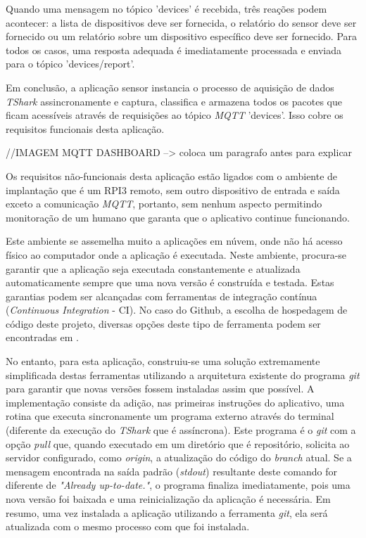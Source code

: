 Quando uma mensagem no tópico 'devices' é recebida, três reações podem acontecer:
a lista de dispositivos deve ser fornecida, o relatório do sensor deve ser
fornecido ou um relatório sobre um dispositivo específico deve ser fornecido.
Para todos os casos, uma resposta adequada é imediatamente processada e enviada
para o tópico 'devices/report'.

Em conclusão, a aplicação sensor instancia o processo de aquisição de dados
\emph{TShark} assincronamente e captura, classifica e armazena todos os pacotes
que ficam acessíveis através de requisições ao tópico \emph{MQTT} 'devices'.
Isso cobre os requisitos funcionais desta aplicação.

//IMAGEM MQTT DASHBOARD --> coloca um paragrafo antes para explicar

Os requisitos não-funcionais desta aplicação estão ligados com o ambiente de
implantação que é um RPI3 remoto, sem outro dispositivo de entrada e saída
exceto a comunicação \emph{MQTT}, portanto, sem nenhum aspecto permitindo
monitoração de um humano que garanta que o aplicativo continue funcionando.

Este ambiente se assemelha muito a aplicações em núvem, onde não há acesso
físico ao computador onde a aplicação é executada. Neste ambiente, procura-se
garantir que a aplicação seja executada constantemente e atualizada
automaticamente sempre que uma nova versão é construída e testada. Estas
garantias podem ser alcançadas com ferramentas de integração contínua
(\emph{Continuous Integration} - CI). No caso do Github, a escolha de hospedagem
de código deste projeto, diversas opções deste tipo de ferramenta podem ser
encontradas em \cite{githubdeploy}.

No entanto, para esta aplicação, construiu-se uma solução extremamente
simplificada destas ferramentas utilizando a arquitetura existente do programa
\emph{git} para garantir que novas versões fossem instaladas assim que possível.
A implementação consiste da adição, nas primeiras instruções do aplicativo,
uma rotina que executa sincronamente um programa externo através do terminal
(diferente da execução do \emph{TShark} que é assíncrona). Este programa é
o \emph{git} com a opção \emph{pull} que, quando executado em um diretório que
é repositório, solicita ao servidor configurado, como \emph{origin}, a atualização
do código do \emph{branch} atual. Se a mensagem encontrada na saída padrão
(\emph{stdout}) resultante deste comando for diferente de
\emph{"Already up-to-date."}, o programa finaliza imediatamente, pois uma nova
versão foi baixada e uma reinicialização da aplicação é necessária.
Em resumo, uma vez instalada a aplicação utilizando a ferramenta \emph{git}, ela
será atualizada com o mesmo processo com que foi instalada.

